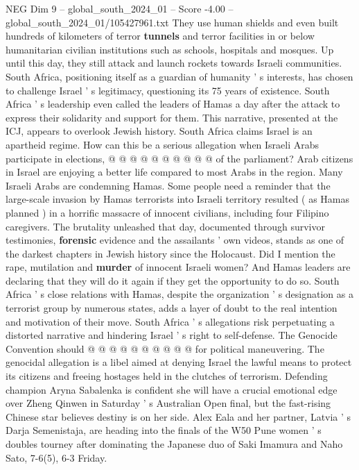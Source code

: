 \begin{textsample}{NEG Dim 9 – global\_south\_2024\_01 – Score -4.00 – global\_south\_2024\_01/105427961.txt}
They use human shields and even built hundreds of kilometers of terror \textbf{tunnels} and terror facilities in or below humanitarian civilian institutions such as schools, hospitals and mosques.
Up until this day, they still attack and launch rockets towards Israeli communities.
South Africa, positioning itself as a guardian of humanity ' s interests, has chosen to challenge Israel ' s legitimacy, questioning its 75 years of existence.
South Africa ' s leadership even called the leaders of Hamas a day after the attack to express their solidarity and support for them.
This narrative, presented at the ICJ, appears to overlook Jewish history.
South Africa claims Israel is an apartheid regime.
How can this be a serious allegation when Israeli Arabs participate in elections, @ @ @ @ @ @ @ @ @ @ of the parliament?
Arab citizens in Israel are enjoying a better life compared to most Arabs in the region.
Many Israeli Arabs are condemning Hamas.
Some people need a reminder that the large-scale invasion by Hamas terrorists into Israeli territory resulted ( as Hamas planned ) in a horrific massacre of innocent civilians, including four Filipino caregivers.
The brutality unleashed that day, documented through survivor testimonies, \textbf{forensic} evidence and the assailants ' own videos, stands as one of the darkest chapters in Jewish history since the Holocaust.
Did I mention the rape, mutilation and \textbf{murder} of innocent Israeli women?
And Hamas leaders are declaring that they will do it again if they get the opportunity to do so.
South Africa ' s close relations with Hamas, despite the organization ' s designation as a terrorist group by numerous states, adds a layer of doubt to the real intention and motivation of their move.
South Africa ' s allegations risk perpetuating a distorted narrative and hindering Israel ' s right to self-defense.
The Genocide Convention should @ @ @ @ @ @ @ @ @ @ for political maneuvering.
The genocidal allegation is a libel aimed at denying Israel the lawful means to protect its citizens and freeing hostages held in the clutches of terrorism.
Defending champion Aryna Sabalenka is confident she will have a crucial emotional edge over Zheng Qinwen in Saturday ' s Australian Open final, but the fast-rising Chinese star believes destiny is on her side.
Alex Eala and her partner, Latvia ' s Darja Semenistaja, are heading into the finals of the W50 Pune women ' s doubles tourney after dominating the Japanese duo of Saki Imamura and Naho Sato, 7-6(5), 6-3 Friday.

\end{textsample}
